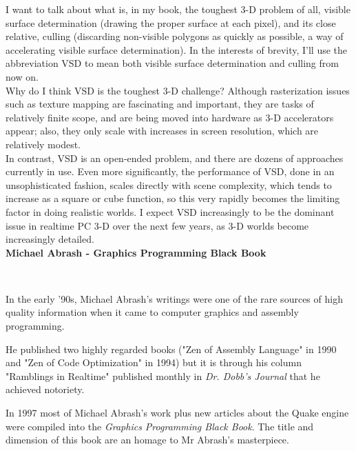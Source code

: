 \begin{fancyquotes}
I want to talk about what is, in my book, the toughest 3-D problem of all, visible surface determination (drawing the proper surface at each pixel), and its close relative, culling (discarding non-visible polygons as quickly as possible, a way of accelerating visible surface determination). In the interests of brevity, I'll use the abbreviation VSD to mean both visible surface determination and culling from now on.
 \bigskip \\
Why do I think VSD is the toughest 3-D challenge? Although rasterization issues such as texture mapping are fascinating and important, they are tasks of relatively finite scope, and are being moved into hardware as 3-D accelerators appear; also, they only scale with increases in screen resolution, which are relatively modest.
 \bigskip \\
In contrast, VSD is an open-ended problem, and there are dozens of approaches currently in use. Even more significantly, the performance of VSD, done in an unsophisticated fashion, scales directly with scene complexity, which tends to increase as a square or cube function, so this very rapidly becomes the limiting factor in doing realistic worlds. I expect VSD increasingly to be the dominant issue in realtime PC 3-D over the next few years, as 3-D worlds become increasingly detailed.
 \bigskip \\
\textbf{Michael Abrash - Graphics Programming Black Book}
 \end{fancyquotes}\\
\par
\begin{figure} 
\vspace{-10pt}
\end{figure} 
 In the early '90s, Michael Abrash's writings were one of the rare sources of high quality information when it came to computer graphics and assembly programming.\\
\par
He published two highly regarded books ("Zen of Assembly Language" in 1990 and "Zen of Code Optimization" in 1994) but it is through his column "Ramblings in Realtime" published monthly in \textit{Dr. Dobb's Journal} that he achieved notoriety.
 \\
\par
 In 1997 most of Michael Abrash's work plus new articles about the Quake engine were compiled into the \textit{Graphics Programming Black Book}. The title and dimension of this book are an homage to Mr Abrash's masterpiece.





